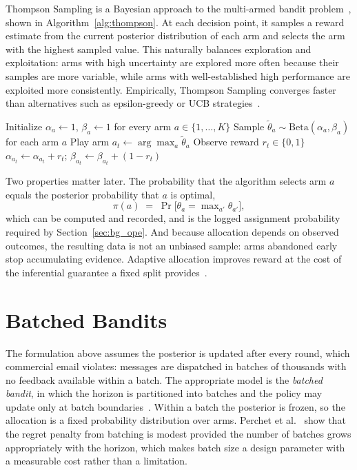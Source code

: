 Thompson Sampling is a Bayesian approach to the multi-armed bandit problem~\cite{chapelle2011empirical}, shown in Algorithm~\ref{alg:thompson}. At each decision point, it samples a reward estimate from the current posterior distribution of each arm and selects the arm with the highest sampled value. This naturally balances exploration and exploitation: arms with high uncertainty are explored more often because their samples are more variable, while arms with well-established high performance are exploited more consistently. Empirically, Thompson Sampling converges faster than alternatives such as epsilon-greedy or UCB strategies~\cite{chapelle2011empirical}.

\begin{algorithm}[htbp]
\caption{Thompson Sampling with Beta--Bernoulli posteriors}
\label{alg:thompson}
\begin{algorithmic}[1]
\State Initialize $\alpha_a \gets 1$, $\beta_a \gets 1$ for every arm $a \in \{1,\dots,K\}$
    \State Sample $\tilde{\theta}_a \sim \mathrm{Beta}(\alpha_a, \beta_a)$ for each arm $a$
    \State Play arm $a_t \gets \arg\max_a \tilde{\theta}_a$ 
    \State Observe reward $r_t \in \{0, 1\}$ 
    \State $\alpha_{a_t} \gets \alpha_{a_t} + r_t$; \quad $\beta_{a_t} \gets \beta_{a_t} + (1 - r_t)$
\EndFor
\end{algorithmic}
\end{algorithm}

Two properties matter later. The probability that the algorithm selects arm $a$ equals the posterior probability that $a$ is optimal,
\begin{equation}
    \pi(a) \;=\; \Pr\bigl[\theta_a = \max\nolimits_{a'} \theta_{a'}\bigr],
    \label{eq:ts_propensity}
\end{equation}
which can be computed and recorded, and is the logged assignment probability required by Section~\ref{sec:bg_ope}. And because allocation depends on observed outcomes, the resulting data is not an unbiased sample: arms abandoned early stop accumulating evidence. Adaptive allocation improves reward at the cost of the inferential guarantee a fixed split provides~\cite{villar2015multi}.

\section{Batched Bandits}
\label{sec:bg_batched}

The formulation above assumes the posterior is updated after every round, which commercial email violates: messages are dispatched in batches of thousands with no feedback available within a batch. The appropriate model is the \emph{batched bandit}, in which the horizon is partitioned into batches and the policy may update only at batch boundaries~\cite{perchet2016batched}. Within a batch the posterior is frozen, so the allocation is a fixed probability distribution over arms. Perchet et al.~\cite{perchet2016batched} show that the regret penalty from batching is modest provided the number of batches grows appropriately with the horizon, which makes batch size a design parameter with a measurable cost rather than a limitation.

